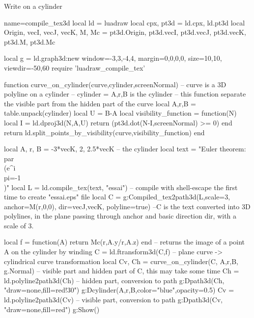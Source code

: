 \begin{demo}{Write on a cylinder}
\begin{luadraw}{name=compile_tex3d}
local ld = luadraw
local cpx, pt3d = ld.cpx, ld.pt3d
local Origin, vecI, vecJ, vecK, M, Mc = pt3d.Origin, pt3d.vecI, pt3d.vecJ, pt3d.vecK, pt3d.M, pt3d.Mc

local g = ld.graph3d:new{ window={-3,3,-4,4}, margin={0,0,0,0}, size={10,10}, viewdir={-50,60}}
require 'luadraw_compile_tex'

function curve_on_cylinder(curve,cylinder,screenNormal) 
-- curve is a 3D polyline on a cylinder
-- cylinder = {A,r,B} is the cylinder
-- this function separate the visible part from the hidden part of the curve
    local A,r,B = table.unpack(cylinder)
    local U = B-A
    local visibility_function = function(N)
        local I = ld.dproj3d(N,{A,U})
        return (pt3d.dot(N-I,screenNormal) >= 0)
    end
    return ld.split_points_by_visibility(curve,visibility_function)
end

local A, r, B = -3*vecK, 2, 2.5*vecK -- the cylinder
local text = "Euler theorem: \\par \\(e^{i\\pi}=-1\\)"
local L = ld.compile_tex(text, "essai") -- compile with shell-escape the first time to create "essai.eps" file
local C = g:Compiled_tex2path3d(L,{scale=3, anchor=M(r,0,0), dir={vecJ,vecK}, polyline=true})
--C is the text converted into 3D polylines, in the plane passing through anchor and basic direction dir, with a scale of 3.

local f = function(A) return Mc(r,A.y/r,A.z) end -- returns the image of a point A on the cylinder by winding
C = ld.ftransform3d(C,f) -- plane curve -> cylindrical curve transformation
local Cv, Ch = curve_on_cylinder(C, {A,r,B}, g.Normal) -- visible part and hidden part of C, this may take some time
Ch = ld.polyline2path3d(Ch) -- hidden part, conversion to path
g:Dpath3d(Ch, "draw=none,fill=red!30")
g:Dcylinder(A,r,B,{color="blue",opacity=0.5})
Cv = ld.polyline2path3d(Cv) -- visible part, conversion to path
g:Dpath3d(Cv, "draw=none,fill=red")
g:Show()
\end{luadraw}
\end{demo}
